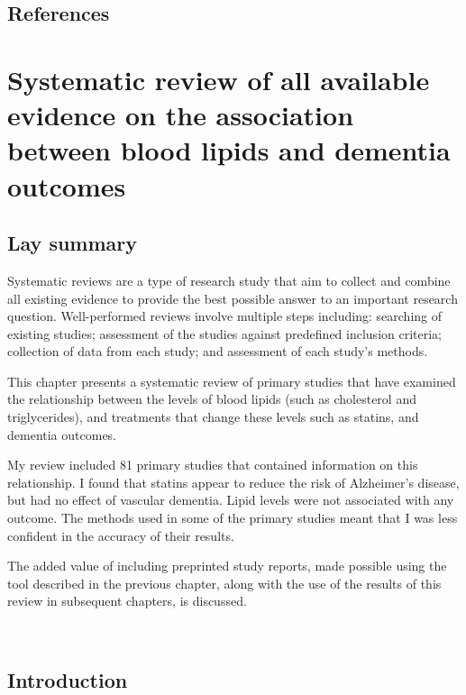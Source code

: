 \documentclass[a4paper, twoside]{templates/ociamthesis}
\begin{document}
\newpage

\hypertarget{references-1}{%
\section{References}\label{references-1}}



\hypertarget{sys-rev-methods-heading}{%
\chapter{Systematic review of all available evidence on the association between blood lipids and dementia outcomes}\label{sys-rev-methods-heading}}

\minitoc 

\hypertarget{lay-summary-2}{%
\section{Lay summary}\label{lay-summary-2}}

Systematic reviews are a type of research study that aim to collect and combine all existing evidence to provide the best possible answer to an important research question. Well-performed reviews involve multiple steps including: searching of existing studies; assessment of the studies against predefined inclusion criteria; collection of data from each study; and assessment of each study's methods.

This chapter presents a systematic review of primary studies that have examined the relationship between the levels of blood lipids (such as cholesterol and triglycerides), and treatments that change these levels such as statins, and dementia outcomes.

My review included 81 primary studies that contained information on this relationship. I found that statins appear to reduce the risk of Alzheimer's disease, but had no effect of vascular dementia. Lipid levels were not associated with any outcome. The methods used in some of the primary studies meant that I was less confident in the accuracy of their results.

The added value of including preprinted study reports, made possible using the tool described in the previous chapter, along with the use of the results of this review in subsequent chapters, is discussed.

~

\hypertarget{sys-rev-intro}{%
\section{Introduction}\label{sys-rev-intro}}
\end{document}
